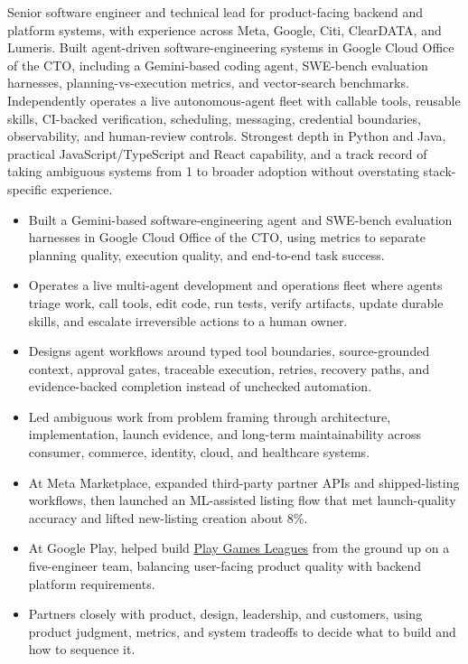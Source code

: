 



Senior software engineer and technical lead for product-facing backend and platform systems, with experience across Meta, Google, Citi, ClearDATA, and Lumeris. Built agent-driven software-engineering systems in Google Cloud Office of the CTO, including a Gemini-based coding agent, SWE-bench evaluation harnesses, planning-vs-execution metrics, and vector-search benchmarks. Independently operates a live autonomous-agent fleet with callable tools, reusable skills, CI-backed verification, scheduling, messaging, credential boundaries, observability, and human-review controls. Strongest depth in Python and Java, practical JavaScript/TypeScript and React capability, and a track record of taking ambiguous systems from 1 to broader adoption without overstating stack-specific experience.

\begin{itemize}
  \item Built a Gemini-based software-engineering agent and SWE-bench evaluation harnesses in Google Cloud Office of the CTO, using metrics to separate planning quality, execution quality, and end-to-end task success.
  \item Operates a live multi-agent development and operations fleet where agents triage work, call tools, edit code, run tests, verify artifacts, update durable skills, and escalate irreversible actions to a human owner.
  \item Designs agent workflows around typed tool boundaries, source-grounded context, approval gates, traceable execution, retries, recovery paths, and evidence-backed completion instead of unchecked automation.
\end{itemize}

\begin{itemize}
  \item Led ambiguous work from problem framing through architecture, implementation, launch evidence, and long-term maintainability across consumer, commerce, identity, cloud, and healthcare systems.
  \item At Meta Marketplace, expanded third-party partner APIs and shipped-listing workflows, then launched an ML-assisted listing flow that met launch-quality accuracy and lifted new-listing creation about 8\%.
  \item At Google Play, helped build \href{https://blog.google/products-and-platforms/platforms/google-play/curation-update-september-2025/}{Play Games Leagues} from the ground up on a five-engineer team, balancing user-facing product quality with backend platform requirements.
  \item Partners closely with product, design, leadership, and customers, using product judgment, metrics, and system tradeoffs to decide what to build and how to sequence it.
\end{itemize}

